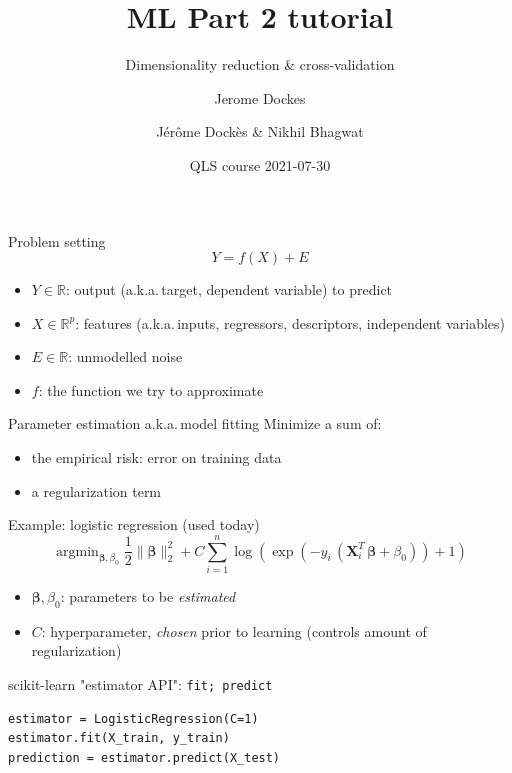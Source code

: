 \documentclass[presentation,mathserif,table]{beamer}
\author{Jerome Dockes}
\date{}
\title{ML Part 2 tutorial}
\author{Jérôme Dockès \& Nikhil Bhagwat}
\date{QLS course 2021-07-30}
\subtitle{Dimensionality reduction \& cross-validation}
\newcommand{\aka}{a.k.a.\,}
\newcommand{\X}{{\mathbold X}}
\newcommand{\bbeta}{{\mathbold \beta}}
\newcommand{\R}{\mathbb{R}}
\DeclareMathOperator*{\argmin}{argmin}
\begin{document}
\maketitle
\begin{frame}[label={sec:org83c43e0}]{Problem setting}
\begin{equation}
Y = f(X) + E
\end{equation}
\vspace{-10pt}
\begin{itemize}
\item \(Y \in \R\): output (\aka target, dependent variable) to predict
\item \(X \in \R^p\): features (\aka inputs, regressors, descriptors, independent variables)
\item \(E \in \R\): unmodelled noise
\item \(f\): the function we try to approximate
\end{itemize}
\end{frame}
\begin{frame}[label={sec:orgcf51a65}]{Parameter estimation \aka model fitting}
Minimize a sum of:
\begin{itemize}
\item the empirical risk: error on training data
\item a regularization term
\end{itemize}
\begin{block}{Example: logistic regression (used today)}
\begin{equation}
\argmin_{\bbeta, \beta_0} \frac{1}{2} \| \bbeta \|_2^2 + C \sum_{i=1}^n \log(\exp(-y_i \, (\X_i^T \, \bbeta + \beta_0)) + 1)
\end{equation}
\end{block}
\begin{structureenv} %
\begin{itemize}
\item \(\bbeta, \beta_0\): parameters to be \emph{estimated}
\item \(C\): hyperparameter, \emph{chosen} prior to learning
(controls amount of regularization)
\end{itemize}
\end{structureenv}
\end{frame}
\begin{frame}[label={sec:org3650718},fragile]{scikit-learn "estimator API": \texttt{fit; predict}}
 \begin{verbatim}
estimator = LogisticRegression(C=1)
estimator.fit(X_train, y_train)
prediction = estimator.predict(X_test)
\end{verbatim}
\end{frame}
\end{document}
